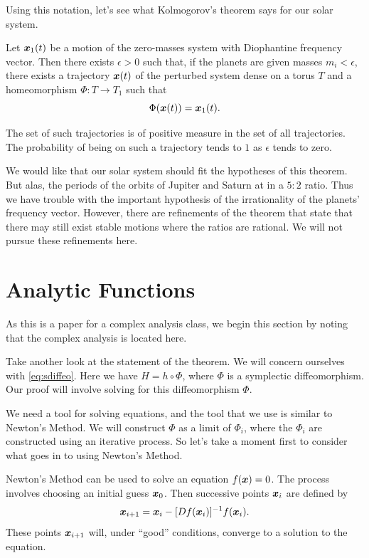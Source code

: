 \documentclass[twoside,letterpaper,11pt]{article}
\numberwithin{equation}{section}
\begin{document}
Using this notation, let's see what Kolmogorov's theorem says for our solar
system.
\begin{thm}
  Let $\bm{x}_1(t)$ be a motion of the zero-masses system with Diophantine
  frequency vector.
  Then there exists $\epsilon > 0$ such that, if the planets are given masses
  $m_i < \epsilon$, there exists a trajectory $\bm{x}(t)$ of the perturbed
  system dense on a torus $T$ and a homeomorphism $\Phi : T \to T_1$ such that
  \begin{equation*}
    \Phi(\bm{x}(t)) = \bm{x}_1(t).
  \end{equation*}

  The set of such trajectories is of positive measure in the set of all
  trajectories.
  The probability of being on such a trajectory tends to $1$ as $\epsilon$ tends
  to zero.
\end{thm}

We would like that our solar system should fit the hypotheses of this theorem.
But alas, the periods of the orbits of Jupiter and Saturn at in a $5 : 2$ ratio.
Thus we have trouble with the important hypothesis of the irrationality of the
planets' frequency vector.
However, there are refinements of the theorem that state that there may still
exist stable motions where the ratios are rational.
We will not pursue these refinements here.

\section{Analytic Functions}
\label{sec:analytic-functions}

As this is a paper for a complex analysis class, we begin this section by noting
that the complex analysis is located here.

Take another look at the statement of the theorem.
We will concern ourselves with \cref{eq:sdiffeo}.
Here we have $H = h \circ \Phi$, where $\Phi$ is a symplectic diffeomorphism.
Our proof will involve solving for this diffeomorphism $\Phi$.

We need a tool for solving equations, and the tool that we use is similar to
Newton's Method.
We will construct $\Phi$ as a limit of $\Phi_i$, where the $\Phi_i$ are
constructed using an iterative process.
So let's take a moment first to consider what goes in to using Newton's Method.

Newton's Method can be used to solve an equation $f(\bm{x}) = 0$.
The process involves choosing an initial guess $\bm{x}_0$.
Then successive points $\bm{x}_i$ are defined by
\begin{equation*}
  \bm{x}_{i+1} = \bm{x}_i - [Df(\bm{x}_i)]^{-1} f(\bm{x}_i).
\end{equation*}
These points $\bm{x}_{i+1}$ will, under ``good'' conditions, converge to a
solution to the equation.
\end{document}
